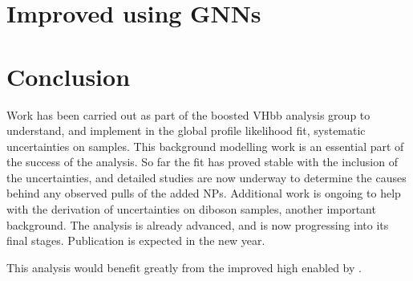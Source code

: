 



\section{Improved \texorpdfstring{\btagging}{b-tagging} using GNNs}


\section{Conclusion}

Work has been carried out as part of the boosted VHbb analysis group to understand, and implement in the global profile likelihood fit, systematic uncertainties on \Vjets samples. This background modelling work is an essential part of the success of the analysis. So far the fit has proved stable with the inclusion of the \Vjets uncertainties, and detailed studies are now underway to determine the causes behind any observed pulls of the added NPs. Additional work is ongoing to help with the derivation of uncertainties on diboson samples, another important background. The analysis is already advanced, and is now progressing into its final stages. Publication is expected in the new year.

This analysis would benefit greatly from the improved high \pt \btagging enabled by \GNN.
